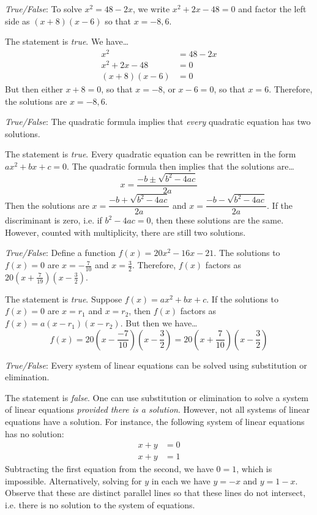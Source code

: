 \documentclass[11pt,letterpaper]{article}
\begin{document}
\quizsol \textit{True/False}: To solve $x^2= 48 - 2x$, we write $x^2 + 2x - 48= 0$ and factor the left side as $(x + 8)(x - 6)$ so that $x= -8, 6$. \pspace

\sol The statement is \textit{true}. We have\dots
	\[
	\begin{aligned}
	x^2&= 48 - 2x \\
	x^2 + 2x - 48&= 0 \\
	(x + 8)(x - 6)&= 0 
	\end{aligned}
	\]
But then either $x + 8= 0$, so that $x= -8$, or $x - 6=0$, so that $x= 6$. Therefore, the solutions are $x= -8, 6$. \pvspace{1cm}



\quizsol \textit{True/False}: The quadratic formula implies that \textit{every} quadratic equation has two solutions. \pspace

\sol The statement is \textit{true}. Every quadratic equation can be rewritten in the form $ax^2 + bx + c= 0$. The quadratic formula then implies that the solutions are\dots
	\[
	x= \dfrac{-b \pm \sqrt{b^2 - 4ac}}{2a}
	\]
Then the solutions are $x= \dfrac{-b + \sqrt{b^2 - 4ac}}{2a}$ and $x= \dfrac{-b - \sqrt{b^2 - 4ac}}{2a}$. If the discriminant is zero, i.e. if $b^2 - 4ac= 0$, then these solutions are the same. However, counted with multiplicity, there are still two solutions. 



\newpage



\quizsol \textit{True/False}: Define a function $f(x)= 20x^2 - 16x - 21$. The solutions to $f(x)= 0$ are $x= -\frac{7}{10}$ and $x= \frac{3}{2}$. Therefore, $f(x)$ factors as $20(x + \frac{7}{19})(x - \frac{3}{2})$. \pspace

\sol The statement is \textit{true}. Suppose $f(x)= ax^2 + bx + c$. If the solutions to $f(x)= 0$ are $x= r_1$ and $x= r_2$, then $f(x)$ factors as $f(x)= a(x - r_1)(x - r_2)$. But then we have\dots
	\[
	f(x)= 20 \left(x - \dfrac{-7}{10} \right) \left(x - \dfrac{3}{2} \right)= 20 \left(x + \dfrac{7}{10} \right) \left(x - \dfrac{3}{2} \right)
	\] \pvspace{1.5cm}



\quizsol \textit{True/False}: Every system of linear equations can be solved using substitution or elimination. \pspace

\sol The statement is \textit{false}. One can use substitution or elimination to solve a system of linear equations \textit{provided there is a solution}. However, not all systems of linear equations have a solution. For instance, the following system of linear equations has no solution:
	\[
	\begin{aligned}
	x + y&= 0 \\
	x + y&= 1
	\end{aligned}
	\]
Subtracting the first equation from the second, we have $0= 1$, which is impossible. Alternatively, solving for $y$ in each we have $y= -x$ and $y= 1 - x$. Observe that these are distinct parallel lines so that these lines do not intersect, i.e. there is no solution to the system of equations. \pvspace{1.5cm}
\end{document}
